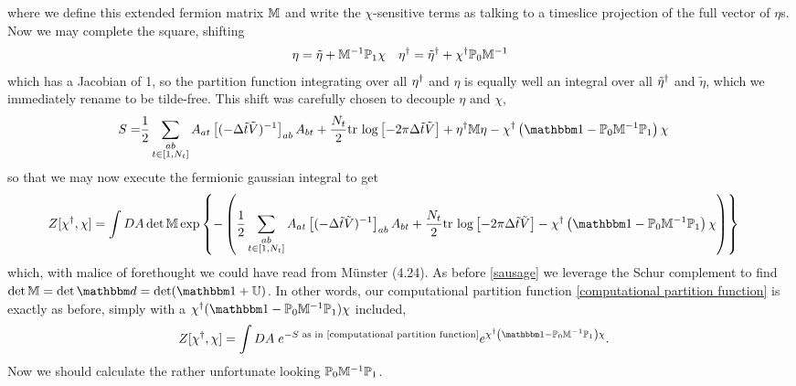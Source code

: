 where we define this extended fermion matrix $\mathbb{M}$ and write the $\chi$-sensitive terms as talking to a timeslice projection of the full vector of $\eta$s.
Now we may complete the square, shifting
\begin{align}
	\eta &= \tilde{\eta} + \mathbb{M}^{-1} \mathbb{P}_1 \chi
	&
	\eta{}^{\dagger} = \tilde{\eta}{}^{\dagger} + \chi{}^{\dagger} \mathbb{P}_0 \mathbb{M}^{-1}
\end{align}
which has a Jacobian of 1, so the partition function integrating over all $\eta{}^{\dagger}$ and $\eta$ is equally well an integral over all $\tilde{\eta}{}^{\dagger}$ and $\tilde{\eta}$, which we immediately rename to be tilde-free.
This shift was carefully chosen to decouple $\eta$ and $\chi$, 
\begin{align}
	S
	=&
	\frac{1}{2} \sum_{\substack{ab \\ t \in [1,N_t]}} A_{at} \left[(-\Delta\tilde{t} \tilde{V})\inverse\right]_{ab} A_{bt} + \frac{N_t}{2} \trlog{ -2\pi \Delta\tilde{t}\tilde{V} }
	+ \eta\adjoint \MM \eta
	- \chi\adjoint \left(\one - \PP_0 \MM\inverse \PP_1\right)\chi
\end{align}
so that we may now execute the fermionic gaussian integral to get
\begin{align}
	Z[\chi\adjoint, \chi]
	&=
	\int DA \det{\MM} \exp\left\{-\left(
		\frac{1}{2} \sum_{\substack{ab \\ t \in [1,N_t]}} A_{at} \left[(-\Delta\tilde{t} \tilde{V})\inverse\right]_{ab} A_{bt} + \frac{N_t}{2} \trlog{ -2\pi \Delta\tilde{t}\tilde{V} }
		- \chi\adjoint \left(\one - \PP_0 \MM\inverse \PP_1\right)\chi
	\right)\right\}
\end{align}
which, with malice of forethought we could have read from M\"{u}nster (4.24).
As before \eqref{sausage} we leverage the Schur complement to find $\det{\MM} = \det{\dd} = \det( \one + \UU )$.
In other words, our computational partition function \eqref{computational partition function} is exactly as before, simply with a $\chi\adjoint(\one - \PP_0 \MM\inverse \PP_1)\chi$ included,
\begin{align}
	Z[\chi\adjoint, \chi]
	&=
	\int DA\; e^{-S \text{ as in \eqref{computational partition function}}}
		e^{ \chi\adjoint \left(\one - \PP_0 \MM\inverse \PP_1\right)\chi }.
\end{align}
Now we should calculate the rather unfortunate looking $\mathbb{P}_0 \mathbb{M}^{-1} \mathbb{P}_1$.


